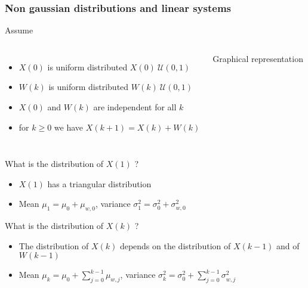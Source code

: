 \begin{frame}
	\frametitle{Non gaussian distributions and linear systems}
	Assume 
	\begin{columns}
		\begin{itemize}
			\item $X(0)$ is uniform distributed $X(0)~\mathcal{U}(0, 1)$
			\item $W(k)$ is uniform distributed $W(k)~\mathcal{U}(0, 1)$
			\item $X(0)$ and $W(k)$ are independent for all $k$
			\item for $k\geq0$ we have $X(k+1) =X(k) + W(k)$
		\end{itemize}	
		\begin{block}{Graphical representation}
		\end{block}
	\end{columns}
	
	\vspace*{0.5em}
	
	 What is the distribution of $X(1)$ ?
	\begin{itemize}
		\item $X(1)$ has a triangular distribution
		\item Mean $\mu_1=\mu_0+\mu_{w,0}$, variance $\sigma_1^2 = \sigma_0^2 + \sigma_{w,0}^2$
	\end{itemize}
	
	\vspace*{0.5em}
	 What is the distribution of $X(k)$ ?
	\begin{itemize}
		\item The distribution of $X(k)$ depends on the distribution of $X(k-1)$ and of $W(k-1)$
		\item Mean $\mu_k=\mu_0+\sum_{j=0}^{k-1}\mu_{w,j}$, variance $\sigma_k^2=\sigma_0^2 + \sum_{j=0}^{k-1}\sigma_{w,j}^2$
	\end{itemize}
\end{frame}


